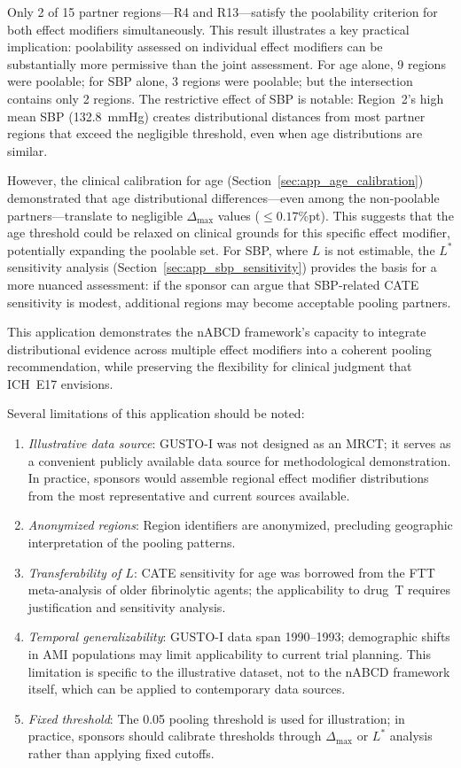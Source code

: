 Only 2 of 15 partner regions---R4 and R13---satisfy the poolability criterion for both effect modifiers simultaneously. This result illustrates a key practical implication: poolability assessed on individual effect modifiers can be substantially more permissive than the joint assessment. For age alone, 9 regions were poolable; for SBP alone, 3 regions were poolable; but the intersection contains only 2 regions. The restrictive effect of SBP is notable: Region~2's high mean SBP (132.8~mmHg) creates distributional distances from most partner regions that exceed the negligible threshold, even when age distributions are similar.

However, the clinical calibration for age (Section~\ref{sec:app_age_calibration}) demonstrated that age distributional differences---even among the non-poolable partners---translate to negligible $\Delta_{\max}$ values ($\leq 0.17$\%pt). This suggests that the age threshold could be relaxed on clinical grounds for this specific effect modifier, potentially expanding the poolable set. For SBP, where $L$ is not estimable, the $L^*$ sensitivity analysis (Section~\ref{sec:app_sbp_sensitivity}) provides the basis for a more nuanced assessment: if the sponsor can argue that SBP-related CATE sensitivity is modest, additional regions may become acceptable pooling partners.

This application demonstrates the nABCD framework's capacity to integrate distributional evidence across multiple effect modifiers into a coherent pooling recommendation, while preserving the flexibility for clinical judgment that ICH~E17 envisions.

Several limitations of this application should be noted:
\begin{enumerate}[1.]
\item \emph{Illustrative data source}: GUSTO-I was not designed as an MRCT; it serves as a convenient publicly available data source for methodological demonstration. In practice, sponsors would assemble regional effect modifier distributions from the most representative and current sources available.
\item \emph{Anonymized regions}: Region identifiers are anonymized, precluding geographic interpretation of the pooling patterns.
\item \emph{Transferability of $L$}: CATE sensitivity for age was borrowed from the FTT meta-analysis of older fibrinolytic agents; the applicability to drug~T requires justification and sensitivity analysis.
\item \emph{Temporal generalizability}: GUSTO-I data span 1990--1993; demographic shifts in AMI populations may limit applicability to current trial planning. This limitation is specific to the illustrative dataset, not to the nABCD framework itself, which can be applied to contemporary data sources.
\item \emph{Fixed threshold}: The 0.05 pooling threshold is used for illustration; in practice, sponsors should calibrate thresholds through $\Delta_{\max}$ or $L^*$ analysis rather than applying fixed cutoffs.
\end{enumerate}
